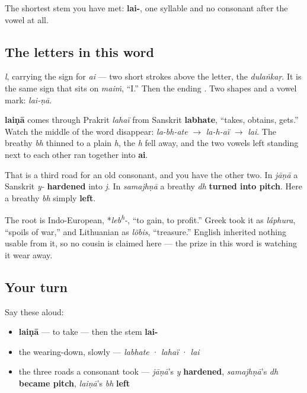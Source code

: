 The shortest stem you have met: \textbf{lai-}, one syllable and no consonant after the vowel at all.

\subsection*{The letters in this word}
\textbf{} \emph{l}, carrying the \textbf{} sign for \emph{ai} — two short strokes above the letter, the \emph{dulaṅkaṛ}. It is the same sign that sits on \textbf{} \emph{maiṁ}, “I.” Then the ending \textbf{}. Two shapes and a vowel mark: \emph{lai-ṇā}.

\begin{cousinweb}
\textbf{laiṇā} comes through Prakrit \emph{lahaï} from Sanskrit \textbf{labhate}, “takes, obtains, gets.” Watch the middle of the word disappear: \emph{la-bh-ate} $\to$ \emph{la-h-aï} $\to$ \emph{lai}. The breathy \emph{bh} thinned to a plain \emph{h}, the \emph{h} fell away, and the two vowels left standing next to each other ran together into \textbf{ai}.

That is a third road for an old consonant, and you have the other two. In \textbf{} \emph{jāṇā} a Sanskrit \emph{y-} \textbf{hardened} into \emph{j}. In \emph{samajhṇā} a breathy \emph{dh} \textbf{turned into pitch}. Here a breathy \emph{bh} simply \textbf{left}.

The root is Indo-European, *\emph{leb\textsuperscript{h}-}, “to gain, to profit.” Greek took it as \emph{láphura}, “spoils of war,” and Lithuanian as \emph{lõbis}, “treasure.” English inherited nothing usable from it, so no cousin is claimed here — the prize in this word is watching it wear away.
\end{cousinweb}

\subsection*{Your turn}
Say these aloud:

\begin{itemize}
\raggedright
  \item \textbf{laiṇā} — to take — then the stem \textbf{lai-}
  \item the wearing-down, slowly — \emph{labhate} · \emph{lahaï} · \emph{lai}
  \item the three roads a consonant took — \emph{jāṇā}'s \emph{y} \textbf{hardened}, \emph{samajhṇā}'s \emph{dh} \textbf{became pitch}, \emph{laiṇā}'s \emph{bh} \textbf{left}
\end{itemize}

